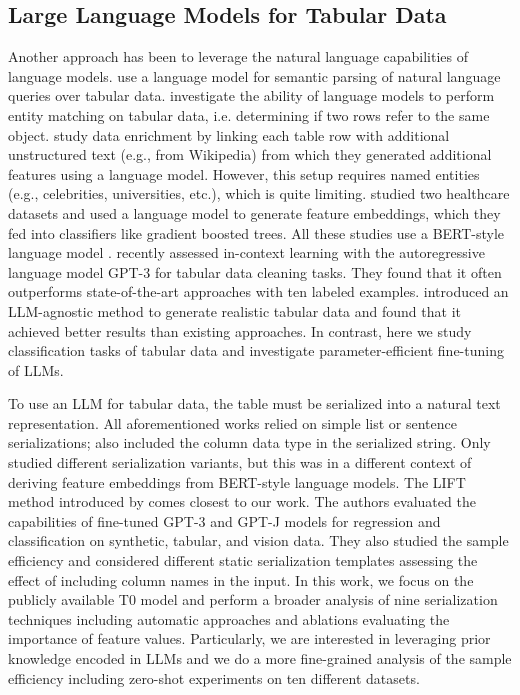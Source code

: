 \subsection{Large Language Models for Tabular Data} Another approach has been to leverage the natural language capabilities of language models.
\citet{yin_tabert_2020} use a language model for semantic parsing of natural language queries over tabular data.
\citet{li_deep_2020} investigate the ability of language models to perform entity matching on tabular data, i.e. determining if two rows refer to the same object.
\citet{harari2022few} study data enrichment by linking each table row with additional unstructured text (e.g., from Wikipedia) from which they generated additional features using a language model. However, this setup requires named entities (e.g., celebrities, universities, etc.), which is quite limiting. 
\citet{bertsimas2022tabtext} studied two healthcare datasets and used a language model to generate feature embeddings, which they fed into classifiers like gradient boosted trees. All these studies use a BERT-style language model \citep{devlin_bert_2019}.
\citet{narayan_can_2022} recently assessed in-context learning with the autoregressive language model GPT-3 for tabular data cleaning tasks. They found that it often outperforms state-of-the-art approaches with ten labeled examples.
\citet{borisov2022language} introduced an LLM-agnostic method to generate realistic tabular data and found that it achieved better results than existing approaches. In contrast, here we study classification tasks of tabular data and investigate parameter-efficient fine-tuning of LLMs.

To use an LLM for tabular data, the table must be serialized into a natural text representation. All aforementioned works relied on simple list or sentence serializations; \citet{yin_tabert_2020} also included the column data type in the serialized string. Only \citet{bertsimas2022tabtext} studied different serialization variants, but this was in a different context of deriving feature embeddings from BERT-style language models. The LIFT method introduced by \citet{dinh2022lift} comes closest to our work. The authors evaluated the capabilities of fine-tuned GPT-3 and GPT-J models for regression and classification on synthetic, tabular, and vision data. They also studied the sample efficiency and considered different static serialization templates assessing the effect of including column names in the input. In this work, we focus on the publicly available T0 model and perform a broader analysis of nine serialization techniques including automatic approaches and ablations evaluating the importance of feature values. Particularly, we are interested in leveraging prior knowledge encoded in LLMs and we do a more fine-grained analysis of the sample efficiency including zero-shot experiments on ten different datasets.


